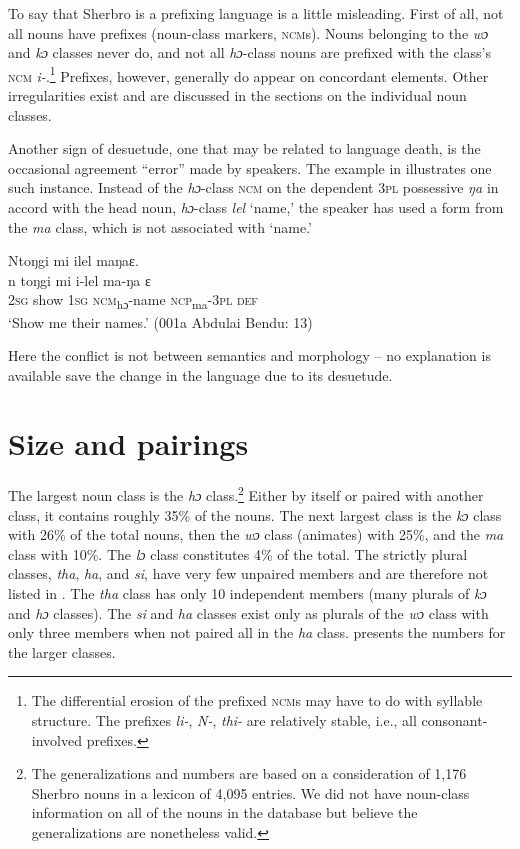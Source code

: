 To say that Sherbro is a prefixing language is a little misleading. First of all, not all nouns have prefixes (noun-class markers, \textsc{ncm}s). Nouns belonging to the \textit{wɔ} and \textit{kɔ} classes never do, and not all \textit{hɔ}\nobreakdash-class nouns are prefixed with the class's \textsc{ncm} \textit{i-}.\footnote{The differential erosion of the prefixed \textsc{ncm}s may have to do with syllable structure. The prefixes \textit{li-}, \textit{N-}, \textit{thi-} are relatively stable, i.e., all consonant-involved prefixes.} Prefixes, however, generally do appear on concordant elements. Other irregularities exist and are discussed in the sections on the individual noun classes.

Another sign of desuetude, one that may be related to language death, is the occasional agreement “error” made by speakers. The example in  illustrates one such instance. Instead of the \textit{hɔ}{}-class \textsc{ncm} on the dependent \textsc{3pl} possessive \textit{ŋa} in accord with the head noun, \textit{hɔ}{}-class \textit{lel} ‘name,' the speaker has used a form from the \textit{ma} class, which is not associated with ‘name.'

\ea%
    \label{ex:138}
    Ntoŋgi mi ilel maŋaɛ.\\
    \gll n    toŋgi    mi    i-lel        ma-ŋa    ɛ\\
    \textsc{2sg}  show    \textsc{1sg}  \textsc{ncm}\textsubscript{hɔ}{}-name  \textsc{ncp}\textsubscript{ma}{}-\textsc{3pl}  \textsc{def}\\
    \glt ‘Show me their names.' (001a Abdulai Bendu: 13)
\z

Here the conflict is not between semantics and morphology – no explanation is available save the change in the language due to its desuetude.

\section{Size and pairings}
\hypertarget{Toc115517789}{}\label{sec:5.2}
The largest noun class is the \textit{hɔ} class.\footnote{The generalizations and numbers are based on a consideration of 1,176 Sherbro nouns in a lexicon of 4,095 entries. We did not have noun-class information on all of the nouns in the database but believe the generalizations are nonetheless valid.} Either by itself or paired with another class, it contains roughly 35\% of the nouns. The next largest class is the \textit{kɔ} class with 26\% of the total nouns, then the \textit{wɔ} class (animates) with 25\%, and the \textit{ma} class with 10\%. The \textit{lɔ} class constitutes 4\% of the total. The strictly plural classes, \textit{tha}, \textit{ha}, and \textit{si}, have very few unpaired members and are therefore not listed in . The \textit{tha} class has only 10 independent members (many plurals of \textit{kɔ} and \textit{hɔ} classes). The \textit{si} and \textit{ha} classes exist only as plurals of the \textit{wɔ} class with only three members when not paired all in the \textit{ha} class.  presents the numbers for the larger classes.

